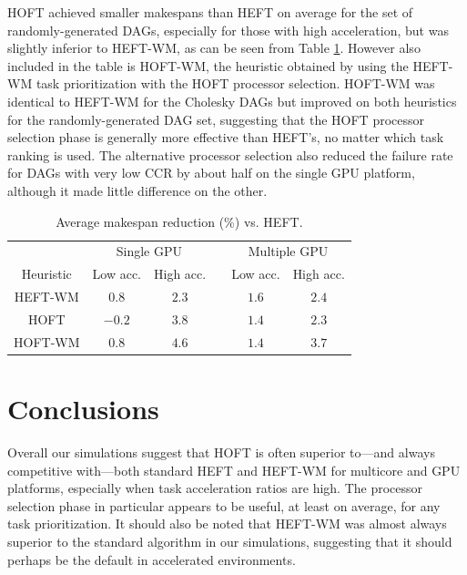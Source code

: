 \documentclass[runningheads]{llncs}
\begin{document}
HOFT achieved smaller makespans than HEFT on average for the set of randomly-generated DAGs, especially for those with high acceleration, but was slightly inferior to HEFT-WM, as can be seen from Table \ref{tb.hoft_random_DAGs}. However also included in the table is HOFT-WM, the heuristic obtained by using the HEFT-WM task prioritization with the HOFT processor selection. HOFT-WM was identical to HEFT-WM for the Cholesky DAGs but improved on both heuristics for the randomly-generated DAG set, suggesting that the HOFT processor selection phase is generally more effective than HEFT's, no matter which task ranking is used. The alternative processor selection also reduced the failure rate for DAGs with very low CCR by about half on the single GPU platform, although it made little difference on the other.     

\begin{table}
	\caption{Average makespan reduction (\%) vs. HEFT.} 
	\begin{center}	
		\begin{tabular}{c c c c c c}
			\toprule
			& \multicolumn{2}{c}{Single GPU} && \multicolumn{2}{c}{Multiple GPU}\\
			\cmidrule{2-3} \cmidrule{5-6}
			Heuristic & Low acc. & High acc. && Low acc. & High acc.\\
			\cmidrule{1-6}
			HEFT-WM & $0.8$ & $2.3$ && $1.6$ & $2.4$ \\
			HOFT & $-0.2$ & $3.8$ && $1.4$ & $2.3$\\
			HOFT-WM & $0.8$ & $4.6$ && $1.4$ & $3.7$\\ 
			\bottomrule			
		\end{tabular}
		\label{tb.hoft_random_DAGs}
	\end{center}	
\end{table}

  


\section{Conclusions}
\label{sect.conclusion}

Overall our simulations suggest that HOFT is often superior to---and always competitive with---both standard HEFT and HEFT-WM for multicore and GPU platforms, especially when task acceleration ratios are high. The processor selection phase in particular appears to be useful, at least on average, for any task prioritization. It should also be noted that HEFT-WM was almost always superior to the standard algorithm in our simulations, suggesting that it should perhaps be the default in accelerated environments. 
\end{document}
